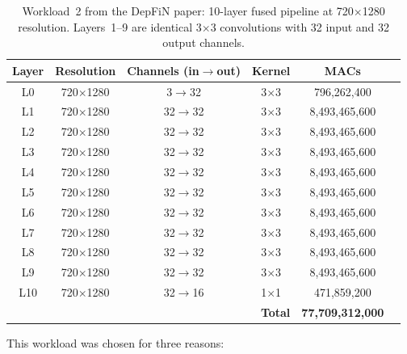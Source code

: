 \begin{table}[htbp]
  \centering
  \caption{Workload~2 from the DepFiN paper: 10-layer fused pipeline
           at 720$\times$1280 resolution.
           Layers~1--9 are identical 3$\times$3 convolutions with
           32 input and 32 output channels.}
  \label{tab:val-workload}
  \small
  \begin{tabular}{c c c c c c}
    \toprule
    \textbf{Layer} & \textbf{Resolution} & \textbf{Channels (in$\to$out)}
      & \textbf{Kernel} & \textbf{MACs} \\
    \midrule
    L0  & 720$\times$1280 & 3$\to$32    & 3$\times$3 &   796,262,400 \\
    L1  & 720$\times$1280 & 32$\to$32   & 3$\times$3 & 8,493,465,600 \\
    L2  & 720$\times$1280 & 32$\to$32   & 3$\times$3 & 8,493,465,600 \\
    L3  & 720$\times$1280 & 32$\to$32   & 3$\times$3 & 8,493,465,600 \\
    L4  & 720$\times$1280 & 32$\to$32   & 3$\times$3 & 8,493,465,600 \\
    L5  & 720$\times$1280 & 32$\to$32   & 3$\times$3 & 8,493,465,600 \\
    L6  & 720$\times$1280 & 32$\to$32   & 3$\times$3 & 8,493,465,600 \\
    L7  & 720$\times$1280 & 32$\to$32   & 3$\times$3 & 8,493,465,600 \\
    L8  & 720$\times$1280 & 32$\to$32   & 3$\times$3 & 8,493,465,600 \\
    L9  & 720$\times$1280 & 32$\to$32   & 3$\times$3 & 8,493,465,600 \\
    L10 & 720$\times$1280 & 32$\to$16   & 1$\times$1 &   471,859,200 \\
    \midrule
    \multicolumn{4}{r}{\textbf{Total}} & \textbf{77,709,312,000} \\
    \bottomrule
  \end{tabular}
\end{table}

This workload was chosen for three reasons:

